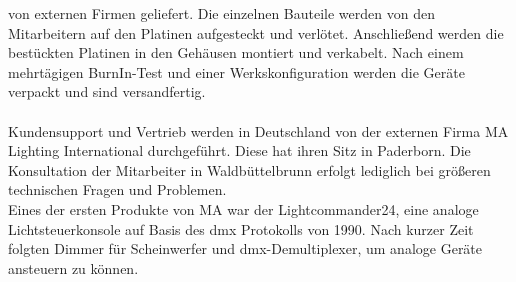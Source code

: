 \documentclass[11pt]{scrartcl}
\begin{document}
von externen Firmen geliefert. Die einzelnen Bauteile werden von den Mitarbeitern auf den
Platinen aufgesteckt und verlötet. Anschließend werden die bestückten Platinen in den Gehäusen
montiert und verkabelt. Nach einem mehrtägigen BurnIn-Test und einer Werkskonfiguration werden
die Geräte verpackt und sind versandfertig.\\
\\
Kundensupport und Vertrieb werden in Deutschland von der externen Firma MA Lighting International
durchgeführt. Diese hat ihren Sitz in Paderborn. Die Konsultation der Mitarbeiter in
Waldbüttelbrunn erfolgt lediglich bei größeren technischen Fragen und Problemen.\\
Eines der ersten Produkte von MA war der Lightcommander24, eine analoge Lichtsteuerkonsole auf
Basis des \ac{dmx} Protokolls von 1990. Nach kurzer Zeit folgten Dimmer für
Scheinwerfer und \ac{dmx}-Demultiplexer, um analoge Geräte ansteuern zu können.\\
\end{document}
